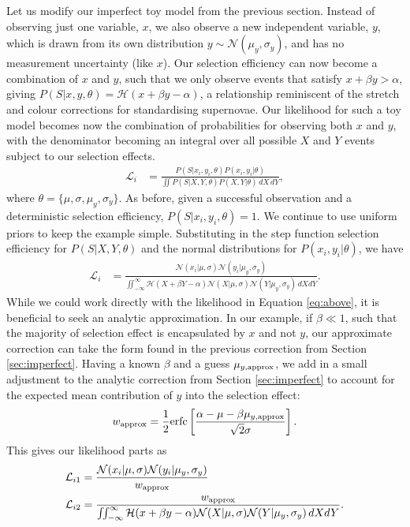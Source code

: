 \documentclass[a4paper,fleqn,usenatbib]{mnras}
\begin{document}
Let us modify our imperfect toy model from the previous section. Instead of observing just one variable, $x$, we also observe a new independent variable, $y$, which is drawn from its own distribution $y \sim \mathcal{N}(\mu_y, \sigma_y)$, and has no measurement uncertainty (like $x$). Our selection efficiency can now become a combination of $x$ and $y$, such that we only observe events that satisfy $x + \beta y > \alpha$, giving $P(S|x,y,\theta) = \mathcal{H}(x + \beta y - \alpha)$, a relationship reminiscent of the stretch and colour corrections for standardising supernovae.  Our likelihood for such a toy model becomes now the combination of probabilities for observing both $x$ and $y$, with the denominator becoming an integral over all possible $X$ and $Y$ events subject to our selection effects.
\begin{align}
\mathcal{L}_i &= \frac{P(S|x_i, y_i,\theta) P(x_i, y_i|\theta)}{\iint P(S | X, Y, \theta) P(X, Y|\theta)\, dX\,dY},
\end{align}
where $\theta = \lbrace \mu, \sigma, \mu_y, \sigma_y \rbrace$. As before, given a successful observation and a deterministic selection efficiency, $P(S|x_i, y_i,\theta) = 1$. We continue to use uniform priors to keep the example simple. Substituting in the step function selection efficiency for $P(S|X, Y,\theta)$ and the normal distributions for $P(x_i, y_i|\theta)$, we have
\begin{align}
\mathcal{L}_i &= \frac{ \mathcal{N}(x_i|\mu, \sigma) \mathcal{N}(y_i|\mu_y, \sigma_y)}
{\iint_{-\infty}^\infty \mathcal{H}(X + \beta Y - \alpha) \mathcal{N}(X|\mu, \sigma) \mathcal{N}(Y|\mu_y, \sigma_y)\, dX dY}. \label{eq:above}
\end{align}
While we could work directly with the likelihood in Equation \eqref{eq:above}, it is beneficial to seek an analytic approximation. In our example, if $\beta \ll 1$, such that the majority of selection effect is encapsulated by $x$ and not $y$, our approximate correction can take the form found in the previous correction from Section \ref{sec:imperfect}. Having a known $\beta$ and a guess $\mu_{y, {\rm approx}}$, we add in a small adjustment to the analytic correction from Section \ref{sec:imperfect} to account for the expected mean contribution of $y$ into the selection effect:
\begin{align}
w_{\rm approx} = \frac{1}{2} {\rm erfc}\left[ \frac{\alpha - \mu - \beta \mu_{y, {\rm approx}}}{\sqrt{2}\sigma} \right].
\end{align}
This gives our likelihood parts as
\begin{align}
\mathcal{L}_{i1} &= \frac{ \mathcal{N}(x_i|\mu, \sigma) \mathcal{N}(y_i|\mu_y, \sigma_y)}{w_{\rm approx} } \\
\mathcal{L}_{i2} &= \frac{ w_{\rm approx}  }{\iint_{-\infty}^\infty \mathcal{H}(x + \beta y - \alpha) \mathcal{N}(X|\mu, \sigma) \mathcal{N}(Y|\mu_y, \sigma_y)\, dX dY}.
\end{align}
\end{document}
